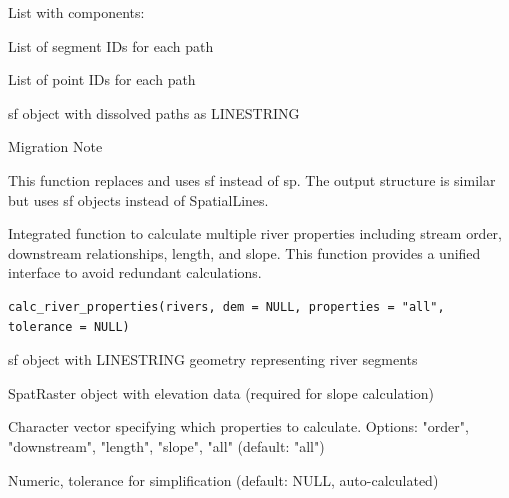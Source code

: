 \documentclass[a4paper]{book}
\begin{document}
%
\begin{Value}
List with components:
\begin{ldescription}
\item[\code{seg\_ids}] List of segment IDs for each path
\item[\code{point\_ids}] List of point IDs for each path
\item[\code{paths}] sf object with dissolved paths as LINESTRING
\end{ldescription}
\end{Value}
%
\begin{Section}{Migration Note}

This function replaces  and uses sf instead of sp.
The output structure is similar but uses sf objects instead of SpatialLines.
\end{Section}
%
\begin{Examples}
\end{Examples}
%
\begin{Description}\relax
Integrated function to calculate multiple river properties including
stream order, downstream relationships, length, and slope. This function
provides a unified interface to avoid redundant calculations.
\end{Description}
%
\begin{Usage}
\begin{verbatim}
calc_river_properties(rivers, dem = NULL, properties = "all", tolerance = NULL)
\end{verbatim}
\end{Usage}
%
\begin{Arguments}
\begin{ldescription}
\item[\code{rivers}] sf object with LINESTRING geometry representing river segments

\item[\code{dem}] SpatRaster object with elevation data (required for slope calculation)

\item[\code{properties}] Character vector specifying which properties to calculate.
Options: "order", "downstream", "length", "slope", "all" (default: "all")

\item[\code{tolerance}] Numeric, tolerance for simplification (default: NULL, auto-calculated)
\end{ldescription}
\end{Arguments}
\end{document}
